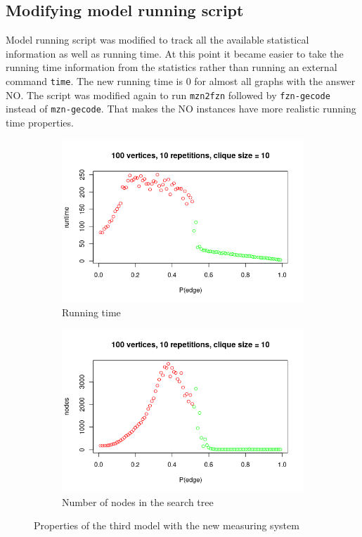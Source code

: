 \documentclass{article}
\theoremstyle{definition}
\begin{document}
\subsection{Modifying model running script}
Model running script was modified to track all the available statistical information as well as running time. At this point it became easier to take the running time information from the statistics rather than running an external command \texttt{time}. The new running time is 0 for almost all graphs with the answer NO. The script was modified again to run \texttt{mzn2fzn} followed by \texttt{fzn-gecode} instead of \texttt{mzn-gecode}. That makes the NO instances have more realistic running time properties.
\begin{figure}
  \begin{subfigure}{.5\textwidth}
    \includegraphics[scale=0.5]{3_runtime.png}
    \caption{Running time}
    \label{fig:3_runtime}
  \end{subfigure}
  \begin{subfigure}{.5\textwidth}
    \includegraphics[scale=0.5]{3_nodes.png}
    \caption{Number of nodes in the search tree}
    \label{fig:3_nodes}
  \end{subfigure}
  \caption{Properties of the third model with the new measuring system}
  \label{fig:3_properties}
\end{figure}
\end{document}
